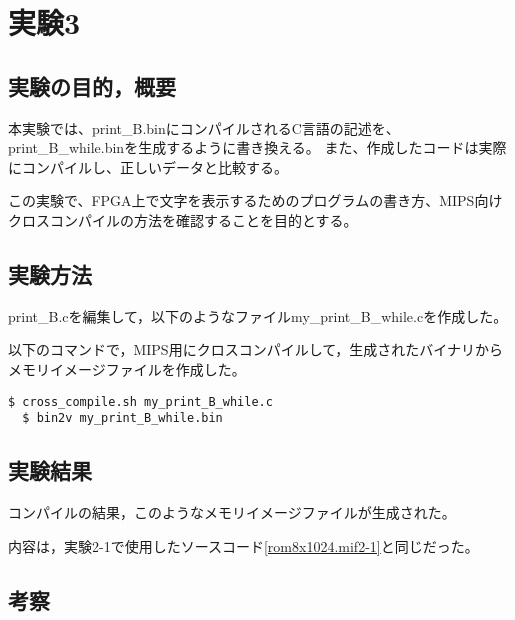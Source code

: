 \section{実験3}
\subsection{実験の目的，概要}
本実験では、print\_B.binにコンパイルされるC言語の記述を、print\_B\_while.binを生成するように書き換える。
また、作成したコードは実際にコンパイルし、正しいデータと比較する。

この実験で、FPGA上で文字を表示するためのプログラムの書き方、MIPS向けクロスコンパイルの方法を確認することを目的とする。

\subsection{実験方法}
print\_B.cを編集して，以下のようなファイルmy\_print\_B\_while.cを作成した。


以下のコマンドで，MIPS用にクロスコンパイルして，生成されたバイナリからメモリイメージファイルを作成した。

\begin{lstlisting}[caption={クロスコンパイル},label={クロスコンパイル}]
  $ cross_compile.sh my_print_B_while.c
  $ bin2v my_print_B_while.bin
\end{lstlisting}

\subsection{実験結果}
コンパイルの結果，このようなメモリイメージファイルが生成された。


内容は，実験2-1で使用したソースコード\ref{rom8x1024.mif2-1}と同じだった。

\subsection{考察}
